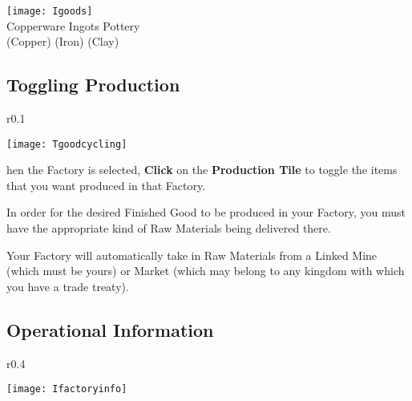
\begin{center}
    \texttt{[image: Igoods]} %
    \\ Copperware Ingots Pottery
    \\ (Copper) (Iron) (Clay)
\end{center}

\subsection{\textsf{Toggling Production}}


\begin{wrapfigure}{r}{0.1\textwidth}
    \vspace{-20pt}
    \begin{center}
        \texttt{[image: Tgoodcycling]}
    \end{center}
    \vspace{-20pt}
\end{wrapfigure}

hen the Factory is selected, \textbf{Click} on the \textbf{Production Tile} to toggle the items that you want produced in that Factory.

In order for the desired Finished Good to be produced in your Factory, you must have the appropriate kind of Raw Materials being delivered there.

Your Factory will automatically take in Raw Materials from a Linked Mine (which must be yours) or Market (which may belong to any kingdom with which you have a trade treaty).

\subsection{\textsf{Operational Information}}


\begin{wrapfigure}{r}{0.4\textwidth}
    \vspace{-20pt}
    \begin{center}
        \texttt{[image: Ifactoryinfo]} %
    \end{center}
    \vspace{-20pt}
\end{wrapfigure}

